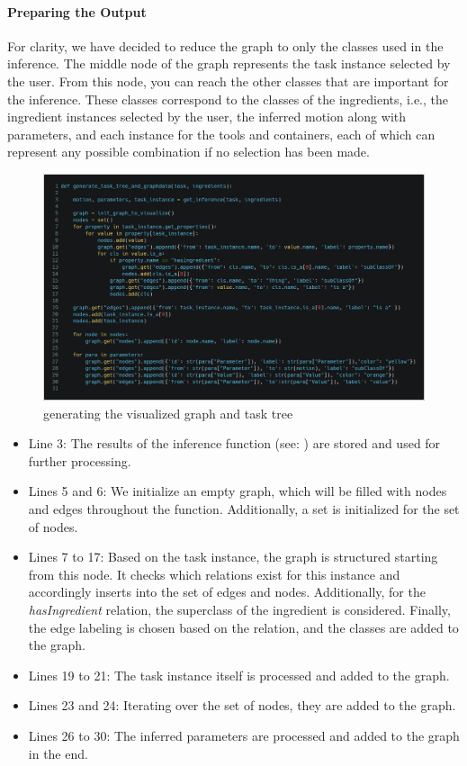 \paragraph*{Preparing the Output}
For clarity, we have decided to reduce the graph to only the classes used in the inference. The middle node of the graph represents the task instance selected by the user. 
From this node, you can reach the other classes that are important for the inference. 
These classes correspond to the classes of the ingredients, i.e., the ingredient instances selected by the user, the inferred motion along with parameters, 
and each instance for the tools and containers, each of which can represent any possible combination if no selection has been made.
\begin{figure}[H]
    \includegraphics[scale=0.2]{Graphics/get_graph_data_new.png}
    \caption{generating the visualized graph and task tree}
\end{figure}

\begin{itemize}
    \item Line 3: The results of the inference function (see: ) are stored and used for further processing.
    \item Lines 5 and 6: We initialize an empty graph, which will be filled with nodes and edges throughout the function. Additionally, a set is initialized for the set of nodes.
    \item Lines 7 to 17: Based on the task instance, the graph is structured starting from this node. It checks which relations exist for this instance and accordingly inserts into the set of edges and nodes. Additionally, for the \textit{hasIngredient} relation, the superclass of the ingredient is considered. Finally, the edge labeling is chosen based on the relation, and the classes are added to the graph.
    \item Lines 19 to 21: The task instance itself is processed and added to the graph.
    \item Lines 23 and 24: Iterating over the set of nodes, they are added to the graph.
    \item Lines 26 to 30: The inferred parameters are processed and added to the graph in the end.
\end{itemize}

